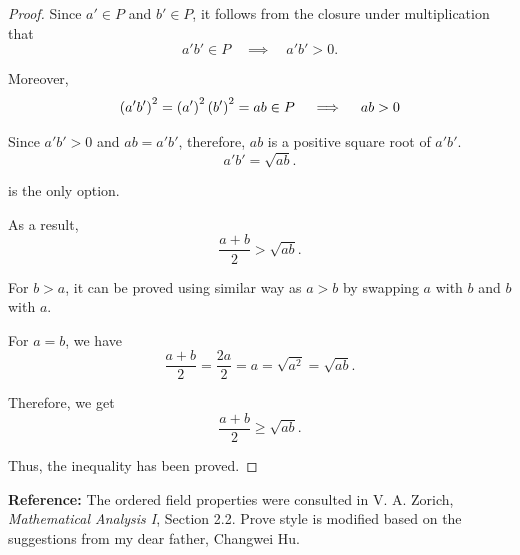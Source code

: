 \begin{enumerate}[label=(\Roman*)]
\begin{proof}
        Since $a' \in P$ and $b' \in P$, it follows from the closure under multiplication that
        \begin{equation*}
            a'b' \in P \quad \implies \quad a'b' > 0. 
        \end{equation*}

        Moreover,
        \begin{equation*}
            \left(a'b'\right)^2
            = \left(a'\right)^2 \left(b'\right)^2
            = ab \in P \quad \implies \quad ab > 0
        \end{equation*}

        Since $a'b' > 0$ and $ab = a'b'$, therefore, $ab$ is a positive square root of $a'b'$. 
        \begin{equation*}
            a'b' = \sqrt{ab}.
        \end{equation*}

        is the only option. 

        As a result,
        \begin{equation*}
            \frac{a + b}{2} > \sqrt{ab}.
        \end{equation*}

        For $b > a$, it can be proved using similar way as $a > b$ by swapping $a$ with $b$ and $b$ with $a$. 

        For $a = b$, we have 
        \begin{equation*}
            \frac{a + b }{2 } = \frac{2a }{2 } = a = \sqrt{a^2} = \sqrt{ab}. 
        \end{equation*}

        Therefore, we get 
        \begin{equation*}
            \frac{a + b }{2} \geq \sqrt{ab}.
        \end{equation*}

        Thus, the inequality has been proved.
    \end{proof}

    \textbf{Reference:} The ordered field properties were consulted in V. A. Zorich, \textit{Mathematical Analysis I}, Section 2.2.
    Prove style is modified based on the suggestions from my dear father, Changwei Hu. 


\end{enumerate}